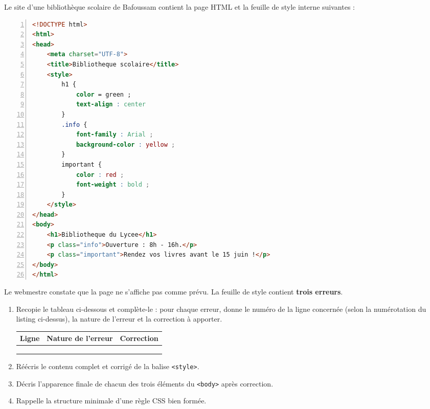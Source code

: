 \documentclass[11pt]{article}
\newcommand{\cle}[1]{{\popxbold\color{popdark}#1}}
\begin{document}
\begin{exercice}
Le site d'une bibliothèque scolaire de Bafoussam contient la page \cle{HTML} et la feuille de style interne suivantes :
\begin{lstlisting}[language=HTML, numbers=left, numberstyle=\tiny, stepnumber=1]
<!DOCTYPE html>
<html>
<head>
    <meta charset="UTF-8">
    <title>Bibliotheque scolaire</title>
    <style>
        h1 {
            color = green ;
            text-align : center
        }
        .info {
            font-family : Arial ;
            background-color : yellow ;
        }
        important {
            color : red ;
            font-weight : bold ;
        }
    </style>
</head>
<body>
    <h1>Bibliotheque du Lycee</h1>
    <p class="info">Ouverture : 8h - 16h.</p>
    <p class="important">Rendez vos livres avant le 15 juin !</p>
</body>
</html>
\end{lstlisting}
Le webmestre constate que la page ne s'affiche pas comme prévu. La feuille de style contient \textbf{trois erreurs}.
\begin{enumerate}
  \item Recopie le tableau ci-dessous et complète-le : pour chaque erreur, donne le numéro de la ligne concernée (selon la numérotation du listing ci-dessus), la nature de l'erreur et la correction à apporter.
\begin{center}
\begin{tabularx}{\linewidth}{|c|X|X|}
\hline
\rowcolor{popblueL} \textbf{Ligne} & \textbf{Nature de l'erreur} & \textbf{Correction} \\
\hline
 & & \\
\hline
 & & \\
\hline
 & & \\
\hline
\end{tabularx}
\end{center}
  \item Réécris le contenu complet et corrigé de la balise \texttt{<style>}.
  \item Décris l'apparence finale de chacun des trois éléments du \texttt{<body>} après correction.
  \item Rappelle la structure minimale d'une règle \cle{CSS} bien formée.
\end{enumerate}
\end{exercice}
\end{document}
